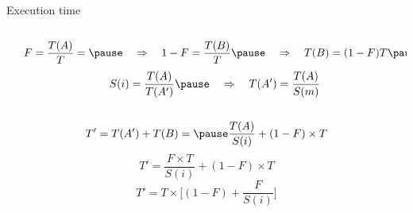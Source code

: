 \begin{frame}[t]{Execution time}
\begin{columns}[T]
\begin{column}{0.35\textwidth}
\end{column}
\pause
\begin{column}{.65\textwidth}
\begin{small}
\begin{displaymath}
F=\frac{T(A)}{T} =\pause
\quad \Rightarrow \quad 1 - F = \frac{T(B)}{T} \pause
\quad \Rightarrow \quad T(B) = (1 - F) T \pause
\end{displaymath}
\pause
\begin{displaymath}
S(i)=\frac{T(A)}{T(A')} \pause
\quad \Rightarrow \quad T(A') = \frac{T(A)}{S(m)}
\end{displaymath}
\end{small}
\end{column}
\end{columns}

\pause
\begin{small}
\begin{displaymath}
T'=T(A')+T(B)= \pause
\frac{T(A)}{S(i)}+(1-F) \times T
\end{displaymath}
\pause
\begin{displaymath}
T'=\frac{F \times T}{S(i)} + (1-F) \times T
\end{displaymath}
\pause
\begin{displaymath}
T'=T \times \Big[ (1 - F) + \frac{F}{S(i)} \Big]
\end{displaymath}
\end{small}
\end{frame}

